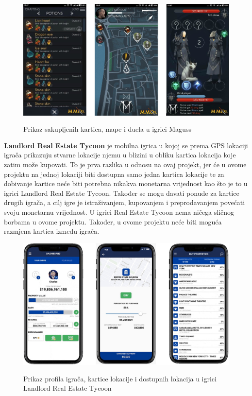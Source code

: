		\begin{figure}[H]
			\centering
			\includegraphics[scale=0.4]{slike/Maguss} \\%
			\caption{Prikaz sakupljenih kartica, mape i duela u igrici Maguss}
			\label{fig:Maguss} %
		\end{figure}
	
		\textnormal{\textbf{Landlord Real Estate Tycoon} je mobilna igrica u kojoj se prema GPS lokaciji igrača prikazuju stvarne lokacije njemu u blizini u obliku kartica lokacija koje zatim može kupovati. To je prva razlika u odnosu na ovaj projekt, jer će u ovome projektu na jednoj lokaciji biti dostupna samo jedna kartica lokacije te za dobivanje kartice neće biti potrebna nikakva monetarna vrijednost kao što je to u igrici Landlord Real Estate Tycoon. Također se mogu davati ponude za kartice drugih igrača, a cilj igre je istraživanjem, kupovanjem i preprodavanjem povećati svoju monetarnu vrijednost. U igrici Real Estate Tycoon nema ničega sličnog borbama u ovome projektu. Također, u ovome projektu neće biti moguća razmjena kartica između igrača. }
		
		\begin{figure}[H]
			\centering
			\includegraphics[scale=0.6]{slike/Landlord} \\%
			\caption{Prikaz profila igrača, kartice lokacije i dostupnih lokacija u igrici Landlord Real Estate Tycoon}
			\label{fig:Landlord} %
		\end{figure}
	
